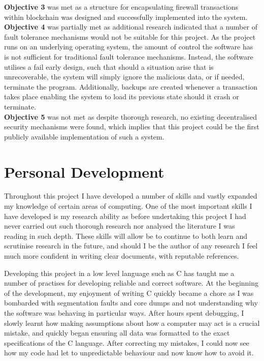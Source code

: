 \documentclass[a4paper, 11pt]{report}
\begin{document}
\textbf{Objective 3} was met as a structure for encapsulating firewall transactions within \gls{blockchain} was designed and successfully implemented into the system.\\

\textbf{Objective 4} was partially met as additional research indicated that a number of fault tolerance mechanisms would not be suitable for this project. As the project runs on an underlying operating system, the amount of control the software has is not sufficient for traditional fault tolerance mechanisms. Instead, the software utilises a fail early design, such that should a situation arise that is unrecoverable, the system will simply ignore the malicious data, or if needed, terminate the program. Additionally, backups are created whenever a transaction takes place enabling the system to load its previous state should it crash or terminate.\\

\textbf{Objective 5} was not met as despite thorough research, no existing decentralised security mechanisms were found, which implies that this project could be the first publicly available implementation of such a system.

\section{Personal Development}
Throughout this project I have developed a number of skills and vastly expanded my knowledge of certain areas of computing. One of the most important skills I have developed is my research ability as before undertaking this project I had never carried out such thorough research nor analysed the literature I was reading in such depth. These skills will allow be to continue to both learn and scrutinise research in the future, and should I be the author of any research I feel much more confident in writing clear documents, with reputable references.

Developing this project in a low level language such as C has taught me a number of practises for developing reliable and correct software. At the beginning of the development, my enjoyment of writing C quickly became a chore as I was bombarded with segmentation faults and core dumps and not understanding why the software was behaving in particular ways. After hours spent debugging, I slowly learnt how making assumptions about how a computer may act is a crucial mistake, and quickly began ensuring all data was formatted to the exact specifications of the C language. After correcting my mistakes, I could now see how my code had let to unpredictable behaviour and now know how to avoid it.
\end{document}
